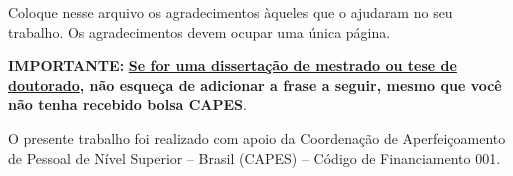 
\guideinfo %
Coloque nesse arquivo os agradecimentos àqueles que o ajudaram no seu trabalho. Os agradecimentos devem ocupar uma única página. 

\textbf{IMPORTANTE:} \textbf{\underline{Se for uma dissertação de mestrado ou tese de doutorado}, não esqueça de adicionar a frase a seguir, mesmo que você não tenha recebido bolsa CAPES}. 

O presente trabalho foi realizado com apoio da Coordenação de Aperfeiçoamento de Pessoal de Nível Superior -- Brasil (CAPES) -- Código de Financiamento 001.